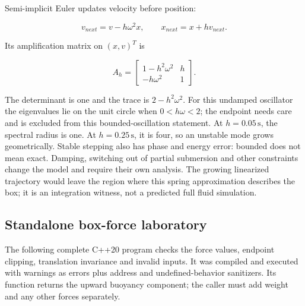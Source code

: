 Semi-implicit Euler updates velocity before position:

\[
v_{next}=v-h\omega^2x,\qquad x_{next}=x+h v_{next}.
\]

Its amplification matrix on \((x,v)^T\) is

\[
A_h=\begin{bmatrix}1-h^2\omega^2&h\\-h\omega^2&1\end{bmatrix}.
\]

The determinant is one and the trace is \(2-h^2\omega^2\). For this undamped oscillator the eigenvalues lie on the unit circle when \(0<h\omega<2\); the endpoint needs care and is excluded from this bounded-oscillation statement. At \(h=0.05\,\mathrm s\), the spectral radius is one. At \(h=0.25\,\mathrm s\), it is four, so an unstable mode grows geometrically. Stable stepping also has phase and energy error: bounded does not mean exact. Damping, switching out of partial submersion and other constraints change the model and require their own analysis. The growing linearized trajectory would leave the region where this spring approximation describes the box; it is an integration witness, not a predicted full fluid simulation.

\subsection{Standalone box-force laboratory}\label{06-engine-ii-ch047-standalone-box-force-laboratory}

The following complete C++20 program checks the force values, endpoint clipping, translation invariance and invalid inputs. It was compiled and executed with warnings as errors plus address and undefined-behavior sanitizers. Its function returns the upward buoyancy component; the caller must add weight and any other forces separately.

